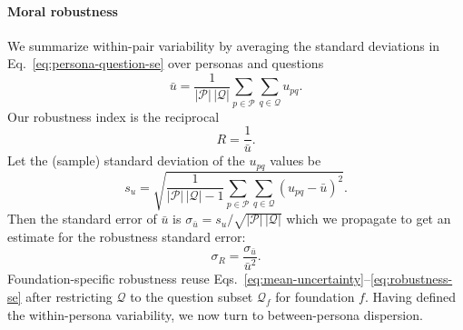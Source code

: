 \documentclass{article}
\begin{document}
\paragraph{Moral robustness} We summarize within-pair variability by averaging the standard deviations in Eq.~\eqref{eq:persona-question-se} over personas and questions
\begin{equation}
  \bar{u} = \frac{1}{|\mathcal{P}|\,|\mathcal{Q}|} \sum_{p \in \mathcal{P}} \sum_{q \in \mathcal{Q}} u_{pq}.\label{eq:mean-uncertainty}
\end{equation}
Our robustness index is the reciprocal
\begin{equation}
  R = \frac{1}{\bar{u}}.\label{eq:robustness}
\end{equation}
Let the (sample) standard deviation of the \(u_{pq}\) values be
\begin{equation}
  s_u = \sqrt{\frac{1}{|\mathcal{P}|\,|\mathcal{Q}| - 1} \sum_{p \in \mathcal{P}} \sum_{q \in \mathcal{Q}} (u_{pq} - \bar{u})^2}.\label{eq:uncertainty-sd}
\end{equation}
Then the standard error of \(\bar{u}\) is \(\sigma_{\bar{u}} = s_u / \sqrt{|\mathcal{P}|\,|\mathcal{Q}|}\) which we propagate to get an estimate for the robustness standard error:
\begin{equation}
  \sigma_R = \frac{\sigma_{\bar{u}}}{\bar{u}^2}.
  \label{eq:robustness-se}
\end{equation}
Foundation-specific robustness reuse Eqs.~\eqref{eq:mean-uncertainty}--\eqref{eq:robustness-se} after restricting \(\mathcal{Q}\) to the question subset \(\mathcal{Q}_f\) for foundation \(f\). Having defined the within-persona variability, we now turn to between-persona dispersion.
\end{document}
